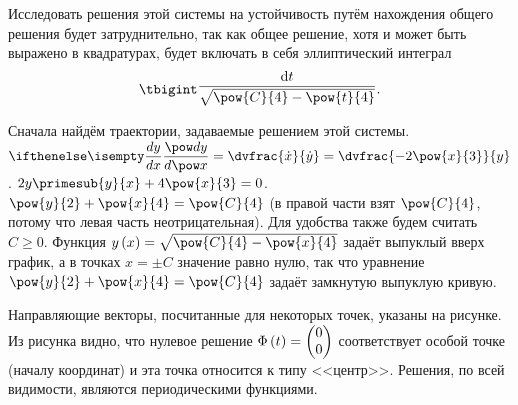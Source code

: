 \documentclass[a5paper,10pt]{article}
\begin{document}
Исследовать решения этой системы на устойчивость путём нахождения общего 
решения будет затруднительно, так как общее решение, хотя и может быть 
выражено в квадратурах, будет включать в себя эллиптический интеграл
$$\tbigint \raisebox{0.25em}{$\dfrac {\di t} {\sqrt{\pow{C}{4} - \pow{t}{4}}}$}.$$
\vspace{-\belowdisplayskip * 5}

Сначала найдём траектории, задаваемые решением этой системы. 
$\der{y}{x} = \dvfrac {\dot{x}} {\dot{y}} 
    = \dvfrac {-2\pow{x}{3}} {y}$. $2y \primesub{y}{x} + 4\pow{x}{3} = 0$.
$\pow{y}{2} + \pow{x}{4} = \pow{C}{4}$
(в правой части взят $\pow{C}{4}$, потому что левая часть неотрицательная). 
Для удобства также будем считать $C \ge 0$. Функция 
$y\br{x} = \sqrt{\pow{C}{4} - \pow{x}{4}}$ задаёт выпуклый вверх график, 
а в точках $x = \pm C$ значение равно нулю, так что уравнение 
$\pow{y}{2} + \pow{x}{4} = \pow{C}{4}$ задаёт замкнутую выпуклую кривую.

Направляющие векторы, посчитанные для некоторых точек, указаны на рисунке. 
Из рисунка видно, что нулевое решение 
$\Phi\left(\hspace{0.01em}t\hspace{0.01em}\right) = \begin{pmatrix} 0 \\ 0 \end{pmatrix}$
соответствует особой точке (началу координат) и эта точка относится к типу <<центр>>.
Решения, по всей видимости, являются периодическими функциями.
\end{document}
